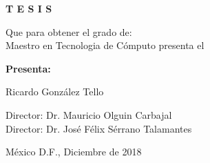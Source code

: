 \vfill
\begin{center}
    \Large\bfseries
   T E S I S
\end{center}

\vfill
\begin{center}
    \large
   Que para obtener el grado de: \\
Maestro en Tecnologia de C\'omputo  presenta el
\end{center}

\vfill
\begin{center}
    \large\bfseries
    Presenta:
    
   Ricardo Gonz\'alez Tello
\end{center}

\vfill\vfill\vfill
\begin{center}
    \large
    Director: Dr. Mauricio Olguin Carbajal\\
    Director: Dr. Jos\'e F\'elix S\'errano Talamantes
\end{center}

\vfill
\begin{center}
\large
    M\'exico D.F., \hfill Diciembre de 2018
\end{center}

\cleardoublepage







\cleardoublepage

\rmfamily
\normalfont

\pagestyle{headings}
\tableofcontents

